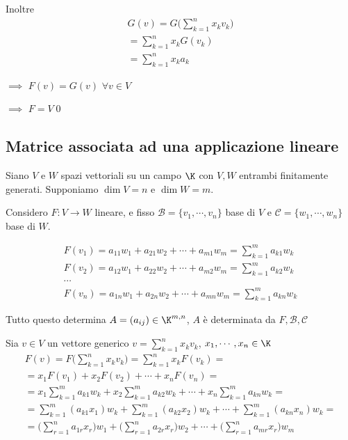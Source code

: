 {\begin{itemize}
	Inoltre
	\begin{multline*}
		G(v)=G\bigg(\sum_{k=1}^{n}x_{k} v_{k} \bigg)\\=\sum_{k=1}^{n}x_{k} G(v_{k})\\=\sum_{k=1}^{n}x_{k} a_{k} 
	\end{multline*} 
	
	$\implies$ $ F(v)=G(v) $ $ \forall v \in V $ 
	
	$\implies$ $F=V$\qed
	\end{itemize}
}

\subsection{Matrice associata ad una applicazione lineare}

Siano $ V $ e $ W $ spazi vettoriali su un campo $ \K $ con $ V,W $ entrambi finitamente generati. Supponiamo $ \dim V =n$ e $ \dim W = m$.

Considero $ F:V\to W $ lineare, e fisso $ \mathscr{B}=\{v_{1}, \cdots, v_{n}  \} $ base di $ V $ e $ \mathscr{C}=\{w_{1}, \cdots, w_{n}  \} $ base di $ W $.

\begin{gather*}
F(v_{1} ) = a_{11} w_{1} + a_{21} w_2+ \cdots + a_{m1} w_{m}=\sum_{k=1}^m a_{k1} w_{k}   \\
F(v_{2} ) = a_{12} w_{1} + a_{22} w_2+ \cdots + a_{m2} w_{m}=\sum_{k=1}^m a_{k2} w_{k}\\
\cdots\\
F(v_{n} ) = a_{1n} w_{1} + a_{2n} w_2+ \cdots + a_{mn} w_{m}=\sum_{k=1}^m a_{kn} w_{k}
\end{gather*}

Tutto questo determina $ A=(a_{ij} ) \in \K^{m,n}$, $ A $ è determinata da $ F, \mathscr{B}, \mathscr{C} $

Sia $ v \in V $ un vettore generico $ v= \sum_{k=1}^n x_{k}v_{k}$, $ x_1, \cdots, x_{n} \in \K  $
\begin{multline*}
	F(v)=F\bigg(\sum_{k=1}^n x_{k}v_{k}\bigg)=\sum_{k=1}^n x_{k}F(v_{k})=\\
	=x_1F(v_1)+x_2F(v_2)+ \cdots + x_{n}F(v_{n} ) =\\
	=x_1\sum_{k=1}^m a_{k1} w_{k}+x_2\sum_{k=1}^m a_{k2} w_{k}+ \cdots + x_{n}\sum_{k=1}^m a_{kn} w_{k}=\\
	=\sum_{k=1}^m (a_{k1} x_1) w_{k}+\sum_{k=1}^m (a_{k2} x_2) w_{k}+ \cdots + \sum_{k=1}^m (a_{kn} x_{n})  w_{k}=\\
	=\bigg(\sum_{r=1}^n a_{1r} x_{r}  \bigg) w_1+\bigg(\sum_{r=1}^n a_{2r} x_{r}  \bigg) w_2 + \cdots + \bigg(\sum_{r=1}^n a_{mr} x_{r}  \bigg) w_m
\end{multline*}

